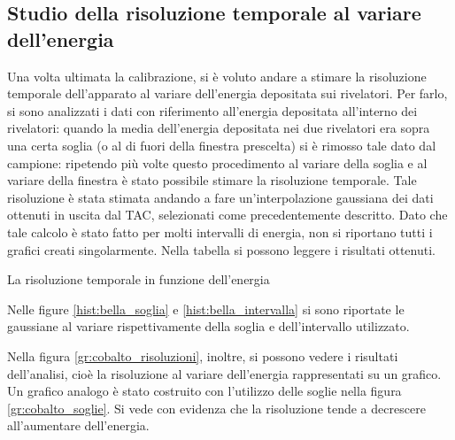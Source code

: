 \subsection{Studio della risoluzione temporale al variare dell'energia}

Una volta ultimata la calibrazione, si è voluto andare a stimare la risoluzione temporale dell'apparato al variare dell'energia depositata sui
rivelatori. Per farlo, si sono analizzati i dati con riferimento all'energia depositata all'interno dei rivelatori: quando la media dell'energia
depositata nei due rivelatori era sopra una certa soglia (o al di fuori della finestra prescelta) si è rimosso tale dato dal campione: ripetendo più
volte questo procedimento al variare della soglia e al variare della finestra è stato possibile stimare la risoluzione temporale. Tale
risoluzione è stata stimata andando a fare un'interpolazione gaussiana dei dati ottenuti in uscita dal TAC, selezionati come precedentemente descritto.
Dato che tale calcolo è stato fatto per molti intervalli di energia, non si riportano tutti i grafici creati singolarmente.
Nella tabella si possono leggere i risultati ottenuti.\\

%
\begin{table}
	\centering
	
	\caption{La risoluzione temporale in funzione dell'energia}
	\label{tab:01tab1}
\end{table}
%
Nelle figure \ref{hist:bella_soglia} e \ref{hist:bella_intervalla} si sono riportate le gaussiane al variare rispettivamente della soglia e dell'intervallo utilizzato.


Nella figura \ref{gr:cobalto_risoluzioni}, inoltre, si possono vedere i risultati dell'analisi, cioè la risoluzione al variare dell'energia rappresentati su un grafico.
Un grafico analogo è stato costruito con l'utilizzo delle soglie nella figura \ref{gr:cobalto_soglie}. Si
vede con evidenza che la risoluzione tende a decrescere all'aumentare dell'energia.
\\
\\



